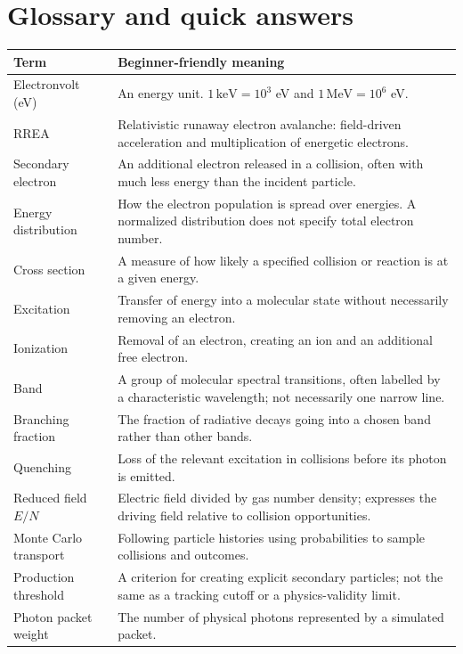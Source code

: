 \documentclass[11pt,a4paper]{article}
\begin{document}
\section*{Glossary and quick answers}
\begin{center}
\begin{tabularx}{\textwidth}{@{}P{38mm}Y@{}}
\toprule
\textbf{Term} & \textbf{Beginner-friendly meaning}\\
\midrule
Electronvolt (eV) & An energy unit. $1\,\mathrm{keV}=10^3$ eV and $1\,\mathrm{MeV}=10^6$ eV.\\
RREA & Relativistic runaway electron avalanche: field-driven acceleration and multiplication of energetic electrons.\\
Secondary electron & An additional electron released in a collision, often with much less energy than the incident particle.\\
Energy distribution & How the electron population is spread over energies. A normalized distribution does not specify total electron number.\\
Cross section & A measure of how likely a specified collision or reaction is at a given energy.\\
Excitation & Transfer of energy into a molecular state without necessarily removing an electron.\\
Ionization & Removal of an electron, creating an ion and an additional free electron.\\
Band & A group of molecular spectral transitions, often labelled by a characteristic wavelength; not necessarily one narrow line.\\
Branching fraction & The fraction of radiative decays going into a chosen band rather than other bands.\\
Quenching & Loss of the relevant excitation in collisions before its photon is emitted.\\
Reduced field $E/N$ & Electric field divided by gas number density; expresses the driving field relative to collision opportunities.\\
Monte Carlo transport & Following particle histories using probabilities to sample collisions and outcomes.\\
Production threshold & A criterion for creating explicit secondary particles; not the same as a tracking cutoff or a physics-validity limit.\\
Photon packet weight & The number of physical photons represented by a simulated packet.\\

\end{tabularx}
\end{center}
\end{document}
